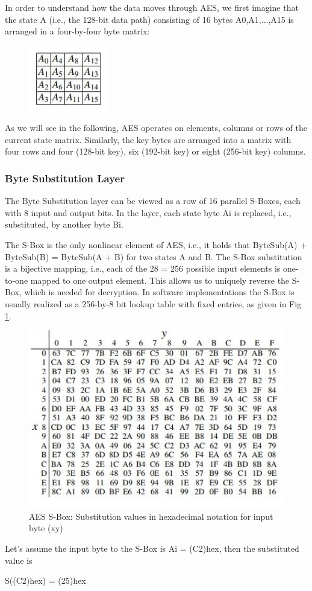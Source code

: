 \documentclass[../main.tex]{subfiles}
\begin{document}
In order to understand how the data moves through AES, we first imagine that the
state A (i.e., the 128-bit data path) consisting of 16 bytes A0,A1,...,A15 is arranged
in a four-by-four byte matrix:
\begin{figure}[h]
\centering
\includegraphics[width=3.5cm]{diagrams/cryp6.jpg}
\end{figure}
As we will see in the following, AES operates on elements, columns or rows of
the current state matrix. Similarly, the key bytes are arranged into a matrix with four
rows and four (128-bit key), six (192-bit key) or eight (256-bit key) columns.

\subsubsection{Byte Substitution Layer}
The Byte Substitution layer can be viewed as a row of 16 parallel S-Boxes, each with 8 input and output bits.
In the layer, each state byte Ai is replaced, i.e.,
substituted, by another byte Bi.

The S-Box is the only nonlinear element of AES, i.e., it holds that ByteSub(A) + ByteSub(B) = ByteSub(A + B) for two states A and B. The S-Box substitution is a
bijective mapping, i.e., each of the 28 = 256 possible input elements is one-to-one
mapped to one output element. This allows us to uniquely reverse the S-Box, which
is needed for decryption. In software implementations the S-Box is usually realized
as a 256-by-8 bit lookup table with fixed entries,\cite{10.5555/1721909} as given in Fig \ref{fig:cryp8}.

\begin{figure}[h]
\centering
\includegraphics[width=13cm]{diagrams/cryp8.jpg}

\caption{AES S-Box: Substitution values in hexadecimal notation for input byte (xy)}
\label{fig:cryp8}
\end{figure}
Let’s assume the input byte to the S-Box is Ai = (C2)hex, then the
substituted value is
\begin{center} 
S((C2)hex) = (25)hex
\end{center}
\end{document}
